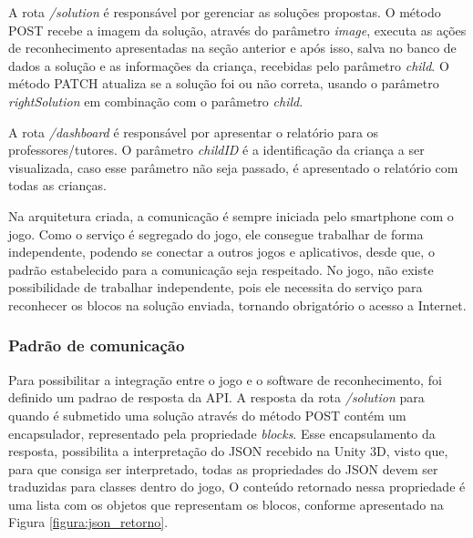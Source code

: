     A rota \textit{/solution} é responsável por gerenciar as soluções propostas. O método POST recebe a imagem da solução, através do parâmetro \textit{image}, executa as ações de reconhecimento apresentadas na seção anterior e após isso, salva no banco de dados a solução e as informações da criança, recebidas pelo parâmetro \textit{child}. O método PATCH atualiza se a solução foi ou não correta, usando o parâmetro \textit{rightSolution} em combinação com o parâmetro \textit{child}.
    
    A rota \textit{/dashboard} é responsável por apresentar o relatório para os professores/tutores. O parâmetro \textit{childID} é a identificação da criança a ser visualizada, caso esse parâmetro não seja passado, é apresentado o relatório com todas as crianças.
    
    Na arquitetura criada, a comunicação é sempre iniciada pelo smartphone com o jogo. Como o serviço é segregado do jogo, ele consegue trabalhar de forma independente, podendo se conectar a outros jogos e aplicativos, desde que, o padrão estabelecido para a comunicação seja respeitado. No jogo, não existe possibilidade de trabalhar independente, pois ele necessita do serviço para reconhecer os blocos na solução enviada, tornando obrigatório o acesso a Internet.
    
    \subsubsection{Padrão de comunicação}
    
    Para possibilitar a integração entre o jogo e o software de reconhecimento, foi definido um padrao de resposta da API. A resposta da rota \textit{/solution} para quando é submetido uma solução através do método POST contém um encapsulador, representado pela propriedade \textit{blocks}. Esse encapsulamento da resposta, possibilita a interpretação do JSON recebido na Unity 3D, visto que, para que consiga ser interpretado, todas as propriedades do JSON devem ser traduzidas para classes dentro do jogo, O conteúdo retornado nessa propriedade é uma lista com os objetos que representam os blocos, conforme apresentado na Figura \ref{figura:json_retorno}.
    
